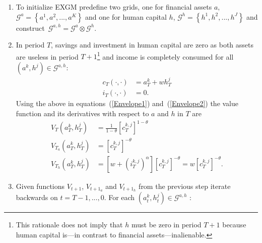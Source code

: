 \documentclass[a4paper,12pt]{article}%
\begin{document}
\begin{enumerate}
\item To initialize EXGM predefine two grids, one for financial assets $a,$
$\mathcal{G}^{a}=\left\{  a^{1},a^{2},...,a^{K}\right\}  $ and one for human
capital $h$, $\mathcal{G}^{h}=\left\{  h^{1},h^{2},...,h^{J}\right\}  $ and
construct~$\mathcal{G}^{a,h}=\mathcal{G}^{a}\otimes\mathcal{G}^{h}$.

\item In period $T$, savings and investment in human capital are zero as both
assets are useless in period $T+1$\footnote{This rationale does not imply that
$h$ must be zero in period $T+1$ because human capital is---in contrast to
financial assets---inalienable.} and income is completely consumed for all
$\left(  a^{k},h^{j}\right)  \in\mathcal{G}^{a,h}$:
\begin{align*}
c_{T}\left(  \cdot,\cdot\right)   &  =a_{T}^{k}+wh_{T}^{j}\\
i_{T}\left(  \cdot,\cdot\right)   &  =0\text{.}%
\end{align*}
Using the above in equations~(\ref{Envelope1}) and~(\ref{Envelope2}) the value
function and its derivatives with respect to $a$ and $h$ in $T$ are
\begin{align*}
V_{T}\left(  a_{T}^{k},h_{T}^{j}\right)   &  =\frac{1}{1-\theta}\left[
c_{T}^{k,j}\right]  ^{1-\theta}\\
\text{$V_{T_{a}}$}\left(  a_{T}^{k},h_{T}^{j}\right)   &  =\left[  c_{T}%
^{k,j}\right]  ^{-\theta}\\
\text{$V_{T_{h}}$}\left(  a_{T}^{k},h_{T}^{j}\right)   &  =\left[  w+ \left(
i_{T}^{k,j}\right)  ^{\alpha}\right]  \left[  c_{T}^{k,j}\right]  ^{-\theta
}=w\left[  c_{T}^{k,j}\right]  ^{-\theta}\text{.}%
\end{align*}


\item Given functions $V_{t+1}$, $V_{t+1_{a}}$ and $V_{t+1_{h}}$ from the
previous step iterate backwards on $t=T-1,...,0$. For each $\left(  a_{t}%
^{k},h_{t}^{j}\right)  \in\mathcal{G}^{a,h}$ :


\end{enumerate}
\end{document}
